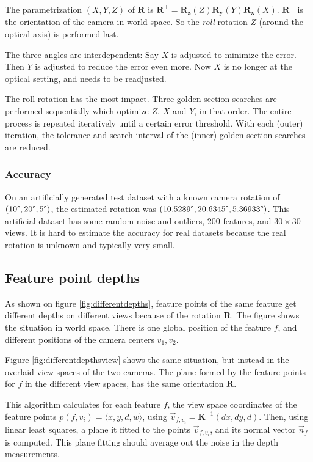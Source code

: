 \documentclass{scrreprt}
\newcommand{\matr}[1]{\mathbf{#1}}
\newcommand{\transpose}[1]{#1^\intercal}
\newcommand{\degr}{\text{\textdegree}}
\begin{document}
The parametrization $(X,Y,Z)$ of $\matr{R}$ is $\transpose{\matr{R}} = \matr{R_z}(Z) \matr{R_y}(Y) \matr{R_x}(X)$. $\transpose{\matr{R}}$ is the orientation of the camera in world space. So the \emph{roll} rotation $Z$ (around the optical axis) is performed last.

The three angles are interdependent: Say $X$ is adjusted to minimize the error. Then $Y$ is adjusted to reduce the error even more. Now $X$ is no longer at the optical setting, and needs to be readjusted.

The roll rotation has the most impact. Three golden-section searches are performed sequentially which optimize $Z$, $X$ and $Y$, in that order. The entire process is repeated iteratively until a certain error threshold. With each (outer) iteration, the tolerance and search interval of the (inner) golden-section searches are reduced.

\subsubsection{Accuracy}
On an artificially generated test dataset with a known camera rotation of $(10\degr, 20\degr, 5\degr)$, the estimated rotation was $(10.5289\degr, 20.6345\degr, 5.36933\degr)$. This artificial dataset has some random noise and outliers, $200$ features, and $30 \times 30$ views. It is hard to estimate the accuracy for real datasets because the real rotation is unknown and typically very small.


\subsection{Feature point depths}
\label{sec:depthrot}
As shown on figure \ref{fig:differentdepths}, feature points of the same feature get different depths on different views because of the rotation $\matr{R}$. The figure shows the situation in world space. There is one global position of the feature $f$, and different positions of the camera centers $v_1, v_2$.

Figure \ref{fig:differentdepthsview} shows the same situation, but instead in the overlaid view spaces of the two cameras. The plane formed by the feature points for $f$ in the different view spaces, has the same orientation $\matr{R}$.

This algorithm calculates for each feature $f$, the view space coordinates of the feature points $p(f,v_i) = \langle x,y,d,w\rangle$, using $\vec{v}_{f,v_i} = \matr{K}^{-1} (d x, d y, d)$. Then, using linear least squares, a plane it fitted to the points $\vec{v}_{f,v_i}$, and its normal vector $\vec{n}_f$ is computed. This plane fitting should average out the noise in the depth measurements.
\end{document}
